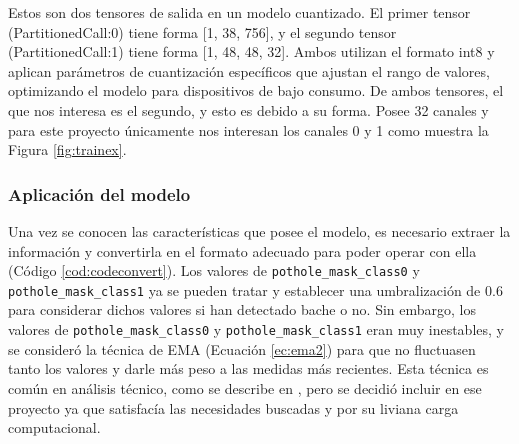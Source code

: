Estos son dos tensores de salida en un modelo cuantizado. El primer tensor (PartitionedCall:0) tiene forma [1, 38, 756], y el segundo tensor (PartitionedCall:1) tiene forma [1, 48, 48, 32]. Ambos utilizan el formato int8 y aplican parámetros de cuantización específicos que ajustan el rango de valores, optimizando el modelo para dispositivos de bajo consumo. De ambos tensores, el que nos interesa es el segundo, y esto es debido a su forma. Posee 32 canales y para este proyecto únicamente nos interesan los canales 0 y 1 como muestra la Figura \ref{fig:trainex}.

\subsubsection{Aplicación del modelo}
\label{subsec:aplicacionmodelo}

Una vez se conocen las características que posee el modelo, es necesario extraer la información y convertirla en el formato adecuado para poder operar con ella (Código \ref{cod:codeconvert}). Los valores de \verb|pothole_mask_class0| y \verb|pothole_mask_class1| ya se pueden tratar y establecer una umbralización de 0.6 para considerar dichos valores si han detectado bache o no. Sin embargo, los valores de \verb|pothole_mask_class0| y \verb|pothole_mask_class1| eran muy inestables, y se consideró la técnica de \ac{EMA} (Ecuación \ref{ec:ema2}) para que no fluctuasen tanto los valores y darle más peso a las medidas más recientes. Esta técnica es común en análisis técnico, como se describe en \cite{6708545}, pero se decidió incluir en ese proyecto ya que satisfacía las necesidades buscadas y por su liviana carga computacional.


